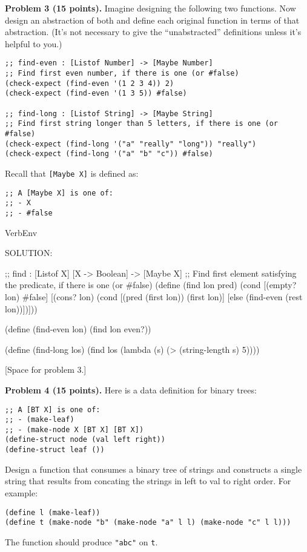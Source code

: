 \documentclass[12pt]{article}
\begin{document}


\newpage

\noindent
{\bf Problem 3 (15 points).}
%
Imagine designing the following two functions.  Now design an
abstraction of both and define each original function in terms of that
abstraction.  (It's not necessary to give the ``unabstracted''
definitions unless it's helpful to you.)
\begin{verbatim}
;; find-even : [Listof Number] -> [Maybe Number]
;; Find first even number, if there is one (or #false)
(check-expect (find-even '(1 2 3 4)) 2)
(check-expect (find-even '(1 3 5)) #false)

;; find-long : [Listof String] -> [Maybe String]
;; Find first string longer than 5 letters, if there is one (or #false)
(check-expect (find-long '("a" "really" "long")) "really")
(check-expect (find-long '("a" "b" "c")) #false)
\end{verbatim}
Recall that {\tt [Maybe X]} is defined as:
\begin{verbatim}
;; A [Maybe X] is one of:
;; - X
;; - #false
\end{verbatim}

\begin{SaveVerbatim}{VerbEnv}


SOLUTION:

;; find : [Listof X] [X -> Boolean] -> [Maybe X]
;; Find first element satisfying the predicate, if there is one (or #false)
(define (find lon pred)
  (cond [(empty? lon) #false]
        [(cons? lon)
         (cond [(pred (first lon)) (first lon)]
               [else (find-even (rest lon))])]))


(define (find-even lon)
  (find lon even?))

(define (find-long los)
  (find los (lambda (s) (> (string-length s) 5))))
\end{SaveVerbatim}



\newpage

[Space for problem 3.]


\newpage

\noindent
{\bf Problem 4 (15 points).}
%
Here is a data definition for binary trees:
\begin{verbatim}
;; A [BT X] is one of:
;; - (make-leaf)
;; - (make-node X [BT X] [BT X])
(define-struct node (val left right))
(define-struct leaf ())
\end{verbatim}
Design a function that consumes a binary tree of strings and
constructs a single string that results from concating the strings
in left to val to right order.  For example:
\begin{verbatim}
(define l (make-leaf))
(define t (make-node "b" (make-node "a" l l) (make-node "c" l l)))
\end{verbatim}
The function should produce {\tt "abc"} on {\tt t}.
\end{document}
